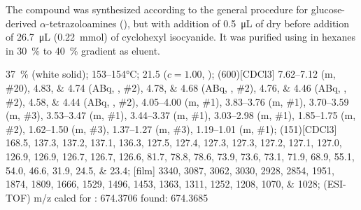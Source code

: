 The compound was synthesized according to the general procedure for glucose-derived $\alpha$-tetrazoloamines (),
but with addition of \SI{0.5}{\micro\liter} of dry  before addition of \SI{26.7}{\micro\liter} (\SI{0.22}{\milli\mol}) of cyclohexyl isocyanide.
It was purified using  in hexanes in \SI{30}{\percent} to \SI{40}{\percent} gradient as eluent.
\begin{fullexp}
	 \SI{37}{\percent} (white solid); 
	 \numrange{153}{154}\si{\celsius}; 
	\data{[$\alpha^{23}_D$]~$=$} \num{21.5} ($c = 1.00$, ); 
	\NMR(600)[CDCl3] \numrange{7.62}{7.12} (m, \#{20}), \numlist{4.83;4.74} (ABq, , \#{2}), \numlist{4.78;4.68} (ABq, , \#{2}), \numlist{4.76;4.46} (ABq, , \#{2}), \numlist{4.58;4.44} (ABq, , \#{2}), \numrange{4.05}{4.00} (m, \#{1}), \numrange{3.83}{3.76} (m, \#{1}), \numrange{3.70}{3.59} (m, \#{3}), \numrange{3.53}{3.47} (m, \#{1}), \numrange{3.44}{3.37} (m, \#{1}), \numrange{3.03}{2.98} (m, \#{1}), \numrange{1.85}{1.75} (m, \#{2}), \numrange{1.62}{1.50} (m, \#{3}), \numrange{1.37}{1.27} (m, \#{3}), \numrange{1.19}{1.01} (m, \#{1}); 
	(151)[CDCl3] \numlist{168.5; 137.3; 137.2; 137.1; 136.3; 127.5; 127.4; 127.3; 127.3; 127.2; 127.1; 127.0; 126.9; 126.9; 126.7; 126.7; 126.6; 81.7; 78.8; 78.6; 73.9; 73.6; 73.1; 71.9; 68.9; 55.1; 54.0; 46.6; 31.9; 24.5; 23.4}; 
	[film] \numlist{3340; 3087; 3062; 3030; 2928; 2854; 1951; 1874; 1809; 1666; 1529; 1496; 1453; 1363; 1311; 1252; 1208; 1070; 1028}; 
	 (ESI-TOF) m/z calcd for : \num{674.3706} found: \num{674.3685}
\end{fullexp}

